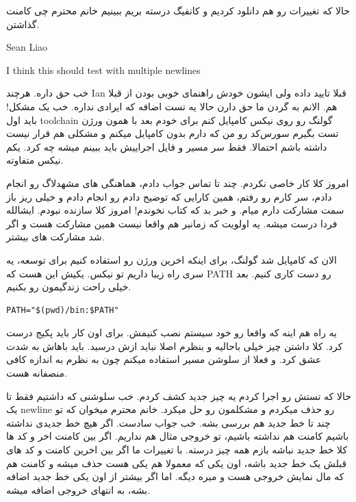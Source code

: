 حالا که تغییرات رو هم دانلود کردیم و کانفیگ درسته بریم ببینیم خانم محترم چی کامنت گذاشتن.

\begin{latin}
Sean Liao

I think this should test with multiple newlines
\end{latin}


خب حق داره. هرچند Ian قبلا تایید داده ولی ایشون خودش راهنمای خوبی بودن از قبلا هم. الانم به گردن ما حق دارن حالا یه تست اضافه که ایرادی نداره.
خب یک مشکل! باید اول toolchain گولنگ رو روی نیکس کامپایل کنم برای خودم بعد با همون ورژن تست بگیرم سورس‌کد رو من که دارم بدون  کامپایل میکنم و مشکلی هم قرار نیست داشته باشم احتمالا.
فقط سر مسیر و فایل اجراییش باید ببینم میشه چه کرد. یکم نیکس متفاوته.

امروز کلا کار خاصی نکردم. چند تا تماس جواب دادم، هماهنگی های مشهدلاگ رو انجام دادم، سر کارم رو رفتم، همین کارایی که توضیح دادم رو انجام دادم و خیلی ریز باز سمت مشارکت دارم میام.
و خبر بد که کتاب نخوندم! امروز کلا سازنده نبودم. ایشالله فردا درست میشه. یه اولویت که زمانبر هم واقعا نیست همین مشارکت هست و اگر شد مشارکت های بیشتر.


الان که کامپایل شد گولنگ، برای اینکه اخرین ورژن رو استفاده کنیم برای توسعه، یه سری راه زیبا داریم تو نیکس. یکیش این هست که PATH رو دست کاری کنیم.
بعد خیلی راحت زندگیمون رو بکنیم.

\begin{latin}
\begin{verbatim}
PATH="$(pwd)/bin:$PATH"
\end{verbatim}
\end{latin}

یه راه هم اینه که واقعا رو خود سیستم نصب کنیمش. برای اون کار باید پکیج درست کرد. کلا  داشتن چیز خیلی باحالیه
و بنظرم اصلا نباید ازش درسید. باید باهاش به شدت عشق کرد. و فعلا از سلوشن مسیر استفاده میکنم چون به نظرم به اندازه کافی منصفانه هست.

حالا که تستش رو اجرا کردم یه چیز جدید کشف کردم. خب سلوشنی که داشتیم فقط تا یک newline رو حذف میکردم و مشکلمون رو حل میکرد. خانم محترم میخوان که تو چند تا خط جدید هم بررسی بشه.
خب جواب سادست. اگر هیچ خط جدیدی نداشته باشیم کامنت هم نداشته باشیم، تو خروجی مثال هم نداریم. اگر بین کامنت اخر و کد ها کلا خط جدید نباشه بازم همه چیز درسته.
با تغییرات ما اگر بین اخرین کامنت و کد های قبلش یک خط جدید باشه، اون یکی که معمولا هم یکی هست حذف میشه و کامنت هم که مال نمایش خروجی هست و میره دیگه.
اما اگر بیشتر از اون یکی خط جدید اضافه بشه، به انتهای خروجی اضافه میشه.

